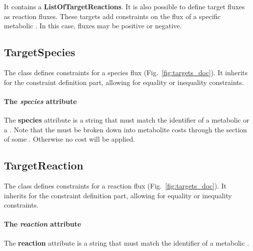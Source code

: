 It contains a \textbf{ListOfTargetReactions}.
It is also possible to define target fluxes as reaction fluxes.
These targets add constraints on the flux of a specific metabolic \reaction.
In this case, fluxes may be positive or negative.


\subsection{TargetSpecies}
\label{sec:target_species}

The \targetspecies{} class defines constraints for a species flux
(Fig.~\ref{fig:targets_doc}).
It inherits \targetvalue{} for the constraint definition part, allowing for
equality or inequality constraints.

\paragraph{The \textit{species} attribute}
The \textbf{species} attribute is a string that must match the identifier
of a metabolic \species{} or a \macromolecule{}.
Note that the \macromolecule{} must be broken down into metabolite costs
through the \processings{} section of some \process{}.
Otherwise no cost will be applied.


\subsection{TargetReaction}
\label{sec:target_reaction}

The \targetreaction{} class defines constraints for a reaction flux
(Fig.~\ref{fig:targets_doc}).
It inherits \targetvalue{} for the constraint definition part, allowing for
equality or inequality constraints.

\paragraph{The \textit{reaction} attribute}
The \textbf{reaction} attribute is a string that must match the identifier
of a metabolic \reaction{}.
